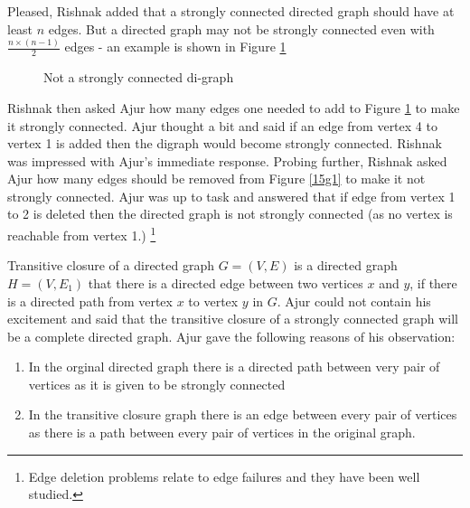 Pleased, Rishnak added that a strongly connected directed graph should have at least $n$ edges. But a directed graph may not be strongly connected even with $\frac{n \times (n-1)}{2}$ edges - an example is shown in Figure \ref{15g3}
\begin{figure}
\begin{center}
\caption{ Not a strongly connected di-graph}\label{15g3}
\end{center}
\end{figure}

Rishnak then asked Ajur how many edges one needed to add to Figure \ref{15g3} to make it strongly connected. Ajur thought a bit and said if an edge from vertex 4 to vertex 1 is added then the digraph would become strongly connected. Rishnak was impressed with Ajur's immediate response. Probing further, Rishnak asked Ajur how many edges should be removed from Figure \ref{15g1} to make it not strongly connected. Ajur was up to task and answered that if edge from vertex 1 to 2 is deleted then the directed graph is not strongly connected (as no vertex is reachable from vertex 1.) \footnote{Edge deletion problems relate to edge failures and they have been well studied.}

Transitive closure of a directed graph $G=(V,E)$ is a directed graph $H=(V,E_1)$ that there is a directed edge between two vertices $x$ and $y$, if there is a directed path from vertex $x$ to vertex $y$ in $G$. Ajur could not contain his excitement and said that the transitive closure of a strongly connected graph will be a complete directed graph. Ajur gave the following reasons of his observation:
\begin{enumerate}
    \item In the orginal directed graph there is a directed path between very pair of vertices as it is given to be strongly connected
    \item In the transitive closure graph there is an edge between every pair of vertices as there is a path between every pair of vertices in the original graph.
\end{enumerate}

